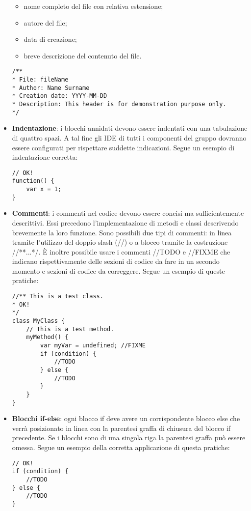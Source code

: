 \begin{itemize}
	\begin{itemize}
		\item nome completo del file con relativa estensione;
		\item autore del file;
		\item data di creazione;
		\item breve descrizione del contenuto del file.
	\end{itemize}
\begin{lstlisting}
/**
* File: fileName
* Author: Name Surname
* Creation date: YYYY-MM-DD
* Description: This header is for demonstration purpose only.
*/
\end{lstlisting}
	\item \textbf{Indentazione}: i blocchi annidati devono essere indentati con una tabulazione di quattro spazi. A tal fine gli IDE di tutti i componenti del gruppo dovranno essere configurati per rispettare suddette indicazioni. Segue un esempio di indentazione corretta:
\begin{lstlisting}
// OK!
function() {
	var x = 1;
}
\end{lstlisting}
	\item \textbf{Commenti}: i commenti nel codice devono essere concisi ma sufficientemente descrittivi. Essi precedono l'implementazione di metodi e classi descrivendo brevemente la loro funzione. Sono possibili due tipi di commenti: in linea tramite l'utilizzo del doppio slash (//) o a blocco tramite la costruzione //**...*/.  È inoltre possibile usare i commenti //TODO e //FIXME che indicano rispettivamente delle sezioni di codice da fare in un secondo momento e sezioni di codice da correggere. Segue un esempio di queste pratiche:
\begin{lstlisting}
//** This is a test class.
* OK!
*/
class MyClass {
	// This is a test method.
	myMethod() {
		var myVar = undefined; //FIXME
		if (condition) {
			//TODO
		} else {
			//TODO
		}
	}
}
\end{lstlisting}
	\item \textbf{Blocchi if-else}: ogni blocco if deve avere un corrispondente blocco else che verrà posizionato in linea con la parentesi graffa di chiusura del blocco if precedente. Se i blocchi sono di una singola riga la parentesi graffa può essere omessa. Segue un esempio della corretta applicazione di questa pratiche:
\begin{lstlisting}
// OK!
if (condition) {
	//TODO
} else {
	//TODO
}


\end{lstlisting}
\end{itemize}
